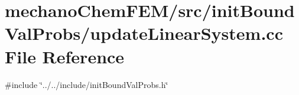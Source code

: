 \section{mechano\+Chem\+F\+E\+M/src/init\+Bound\+Val\+Probs/update\+Linear\+System.cc File Reference}
\label{update_linear_system_8cc}
{\ttfamily \#include \char`\"{}../../include/init\+Bound\+Val\+Probs.\+h\char`\"{}}\newline
